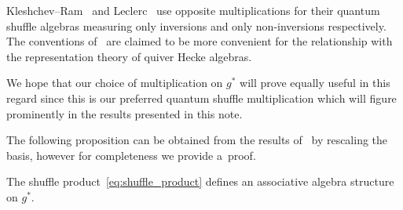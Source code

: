 \begin{Remark}
Kleshchev--Ram~\cite{kleshchev-ram1} and Leclerc~\cite{leclerc} use opposite multiplications for their quantum shuf\/f\/le
algebras measuring only inversions and only non-inversions respectively.
The conventions of~\cite{kleshchev-ram1} are claimed to be more convenient for the relationship with the representation
theory of quiver Hecke algebras.

We hope that our choice of multiplication on $g^*$ will prove equally useful in this regard since this is our preferred
quantum shuf\/f\/le multiplication which will f\/igure prominently in the results presented in this note.
\end{Remark}

The following proposition can be obtained from the results of~\cite{leclerc} by rescaling the basis, however for
completeness we provide a~proof.

\begin{Proposition}%
The shuffle product~\eqref{eq:shuffle_product} defines an associative algebra structure on $g^*$.
\end{Proposition}

